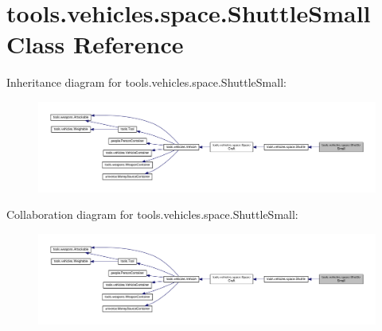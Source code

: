 \hypertarget{classtools_1_1vehicles_1_1space_1_1_shuttle_small}{}\section{tools.\+vehicles.\+space.\+Shuttle\+Small Class Reference}
\label{classtools_1_1vehicles_1_1space_1_1_shuttle_small}


Inheritance diagram for tools.\+vehicles.\+space.\+Shuttle\+Small\+:
\nopagebreak
\begin{figure}[H]
\begin{center}
\leavevmode
\includegraphics[width=350pt]{classtools_1_1vehicles_1_1space_1_1_shuttle_small__inherit__graph}
\end{center}
\end{figure}


Collaboration diagram for tools.\+vehicles.\+space.\+Shuttle\+Small\+:
\nopagebreak
\begin{figure}[H]
\begin{center}
\leavevmode
\includegraphics[width=350pt]{classtools_1_1vehicles_1_1space_1_1_shuttle_small__coll__graph}
\end{center}
\end{figure}
